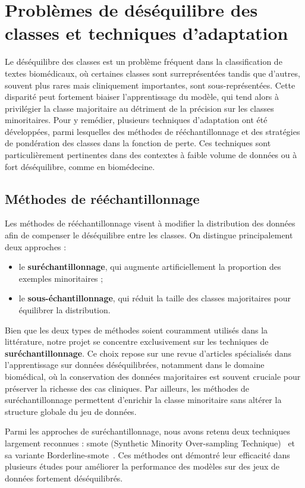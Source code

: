 \documentclass[12pt]{report}
\begin{document}
\section{Problèmes de déséquilibre des classes et techniques d’adaptation}
\label{sec:class-imbalance}

Le déséquilibre des classes est un problème fréquent dans la classification de textes biomédicaux, où certaines classes sont surreprésentées tandis que d’autres, souvent plus rares mais cliniquement importantes, sont sous-représentées. Cette disparité peut fortement biaiser l’apprentissage du modèle, qui tend alors à privilégier la classe majoritaire au détriment de la précision sur les classes minoritaires. Pour y remédier, plusieurs techniques d’adaptation ont été développées, parmi lesquelles des méthodes de rééchantillonnage et des stratégies de pondération des classes dans la fonction de perte. Ces techniques sont particulièrement pertinentes dans des contextes à faible volume de données ou à fort déséquilibre, comme en biomédecine.

\subsection{Méthodes de rééchantillonnage}

Les méthodes de rééchantillonnage visent à modifier la distribution des données afin de compenser le déséquilibre entre les classes. On distingue principalement deux approches :
\begin{itemize}
    \item le \textbf{suréchantillonnage}, qui augmente artificiellement la proportion des exemples minoritaires ;
    \item le \textbf{sous-échantillonnage}, qui réduit la taille des classes majoritaires pour équilibrer la distribution.
\end{itemize}

Bien que les deux types de méthodes soient couramment utilisés dans la littérature, notre projet se concentre exclusivement sur les techniques de \textbf{suréchantillonnage}. Ce choix repose sur une revue d’articles spécialisés dans l’apprentissage sur données déséquilibrées, notamment dans le domaine biomédical, où la conservation des données majoritaires est souvent cruciale pour préserver la richesse des cas cliniques. Par ailleurs, les méthodes de suréchantillonnage permettent d’enrichir la classe minoritaire sans altérer la structure globale du jeu de données.

Parmi les approches de suréchantillonnage, nous avons retenu deux techniques largement reconnues : \gls{smote} (Synthetic Minority Over-sampling Technique)~\cite{chawla2002smote} et sa variante Borderline-\gls{smote}~\cite{han2005borderline}. Ces méthodes ont démontré leur efficacité dans plusieurs études pour améliorer la performance des modèles sur des jeux de données fortement déséquilibrés.
\end{document}
